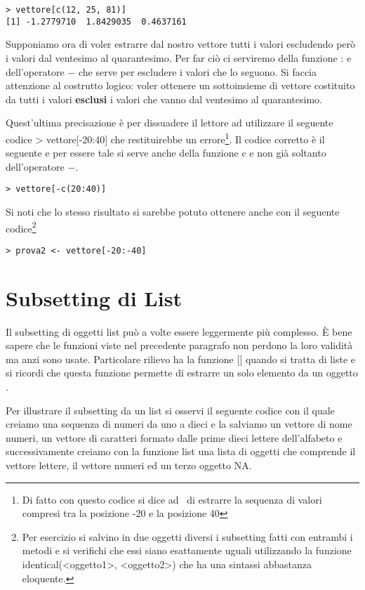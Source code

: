 \begin{lstlisting}
> vettore[c(12, 25, 81)]
[1] -1.2779710  1.8429035  0.4637161
\end{lstlisting}

Supponiamo ora di voler estrarre dal nostro vettore tutti i valori escludendo però i valori dal ventesimo al quarantesimo. Per far ciò ci serviremo della funzione \textsf{:} e dell'operatore \textsf{$-$} che serve per escludere i valori che lo seguono. Si faccia attenzione al costrutto logico: voler ottenere un sottoinsieme di \textsf{vettore} costituito da tutti i valori \textbf{esclusi} i valori che vanno dal ventesimo al quarantesimo.

Quest'ultima precisazione è per dissuadere il lettore ad utilizzare il seguente codice \textsf{> vettore[-20:40]} che restituirebbe un errore\footnote{Di fatto con questo codice si dice ad \erre\ di estrarre la sequenza di valori compresi tra la posizione -20 e la posizione 40}. Il codice corretto è il seguente e per essere tale si serve anche della funzione \textsf{c} e non già soltanto dell'operatore \textsf{$-$}.

\begin{lstlisting}
> vettore[-c(20:40)]
\end{lstlisting}

Si noti che lo stesso risultato si sarebbe potuto ottenere anche con il seguente codice\footnote{Per esercizio si salvino in due oggetti diversi i subsetting fatti con entrambi i metodi e si verifichi che essi siano esattamente uguali utilizzando la funzione \textsf{identical(<oggetto1>, <oggetto2>)} che ha una sintassi abbastanza eloquente.}
\begin{lstlisting}
> prova2 <- vettore[-20:-40]
\end{lstlisting}

\section{Subsetting di List}

Il subsetting di oggetti list può a volte essere leggermente più complesso. È bene sapere che le funzioni viste nel precedente paragrafo non perdono la loro validità ma anzi sono usate. Particolare rilievo ha la funzione \textsf{[[} quando si tratta di liste e si ricordi che questa funzione permette di estrarre un solo elemento da un oggetto \erre.

Per illustrare il subsetting da un list si osservi il seguente codice con il quale creiamo una sequenza di numeri da uno a dieci e la salviamo un vettore di nome \textsf{numeri}, un vettore di caratteri formato dalle prime dieci lettere dell'alfabeto e successivamente creiamo con la funzione \textsf{list} una lista di oggetti che comprende il vettore lettere, il vettore numeri ed un terzo oggetto NA.

